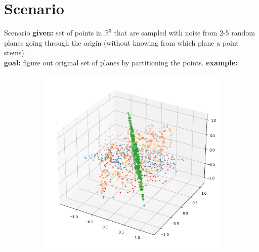 \documentclass[10pt]{beamer}
\newcommand{\R}{\mathbb{R}}
\begin{document}
\section{Scenario}
\begin{frame}{Scenario}
    \textbf{given:} set of points in $\R^3$ that are sampled with noise from 2-5 random planes going through the origin (without knowing from which plane a point stems).\\
    \textbf{goal:} figure out original set of planes by partitioning the points.
    \pause
    \textbf{example:}
    \begin{figure}
        \begin{subfigure}{.4\textwidth}
            \centering
            \includegraphics[width=\textwidth]{pics/ds3.png}
        \end{subfigure}%
        \hspace{1em}
        \begin{subfigure}{.4\textwidth}
            \centering

\end{subfigure}
\end{figure}
\end{frame}
\end{document}

